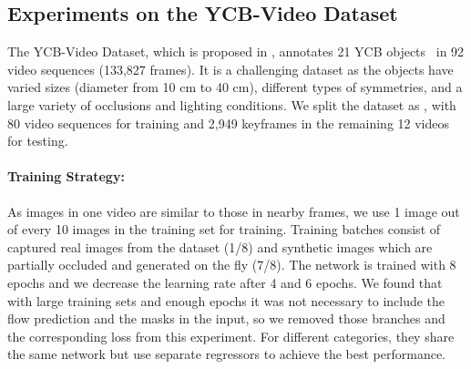 \documentclass[twocolumn]{svjour3}
\begin{document}
% 
\subsection{Experiments on the YCB-Video Dataset}
\label{sec:ycb_video}
The YCB-Video Dataset, which is proposed in \citep{xiang2017posecnn}, annotates 21 YCB objects~\citep{calli2015ycb} in 92 video sequences (133,827 frames). It is a challenging dataset as the objects have varied sizes
(diameter from 10 cm to 40 cm), different types of symmetries,
and a large variety of occlusions and lighting conditions.
We split the dataset as \citep{xiang2017posecnn}, with 80 video sequences for training and 2,949 keyframes in the remaining 12 videos for testing.

\paragraph{Training Strategy:} As images in one video are similar to those in nearby frames, we use 1 image out of every 10 images in the training set for training. Training batches consist of captured real images from the dataset (1/8) and synthetic images which are partially occluded and generated on the fly (7/8). The network is trained with 8 epochs and we decrease the learning rate after 4 and 6 epochs. We found that with large training sets and enough epochs it was not necessary to include the flow prediction and the masks in the input, so we removed those branches and the corresponding loss from this experiment. For different categories, they share the same network but use separate regressors to achieve the best performance.
\end{document}
